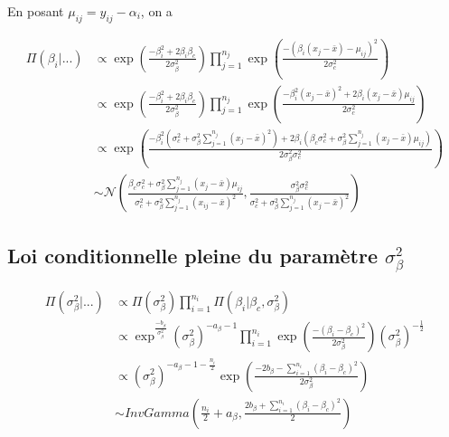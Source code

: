 \documentclass[
]{article}
\begin{document}
En posant \(\mu_{ij} = y_{ij} - \alpha_i\), on a

\begin{align*}
\Pi(\beta_{i}|...)&\propto \exp\left(\frac{-\beta_i^2+2\beta_i\beta_c}{2\sigma_{\beta}^{2}}\right) \prod_{j=1}^{n_{j}} \exp\left(\frac{-(\beta_{i}(x_{j}-\bar{x})-\mu_{ij})^{2}}{2\sigma_{c}^{2}}\right)  \\
        &\propto \exp\left(\frac{-\beta_i^2+2\beta_i\beta_c}{2\sigma_{\beta}^{2}}\right) \prod_{j=1}^{n_{j}} \exp\left(\frac{-\beta_i^2(x_{j}-\bar{x})^2+2\beta_i(x_{j}-\bar{x})\mu_{ij}}{2\sigma_{c}^{2}}\right)  \\
        &\propto \exp\left(\frac{-\beta_i^2(\sigma_c^2+\sigma_{\beta}^2\sum\limits_{j=1}^{n_j}(x_{j}-\bar{x})^2) +2\beta_i(\beta_c\sigma_c^2+\sigma_{\beta}^2\sum\limits_{j=1}^{n_j} (x_{j}-\bar{x})\mu_{ij})}{2\sigma_{\beta}^{2}\sigma_c^2}\right)\\
        &\sim \mathcal{N}\left(\frac{\beta_c\sigma_c^2+\sigma_{\beta}^2\sum\limits_{j=1}^{n_j} (x_{j}-\bar{x})\mu_{ij}}{\sigma_c^2+\sigma_{\beta}^2\sum\limits_{j=1}^{n_j}(x_{ij}-\bar{x})^2},\frac{\sigma_{\beta}^{2}\sigma_c^2}{\sigma_c^2+\sigma_{\beta}^2\sum\limits_{j=1}^{n_j}(x_{j}-\bar{x})^2}\right)
\end{align*}

\hypertarget{loi-conditionnelle-pleine-du-paramuxe8tre-sigma_beta2}{%
\subsection{\texorpdfstring{Loi conditionnelle pleine du paramètre
\(\sigma_{\beta}^2\)}{Loi conditionnelle pleine du paramètre \textbackslash sigma\_\{\textbackslash beta\}\^{}2}}\label{loi-conditionnelle-pleine-du-paramuxe8tre-sigma_beta2}}

\begin{align*}
\Pi(\sigma_{\beta}^{2}|...) &\propto \Pi(\sigma_{\beta}^{2}) \prod_{i=1}^{n_{i}}\Pi(\beta_{i}|\beta_{c},\sigma_{\beta}^{2}) \\
&\propto \exp^{\frac{-b_{\beta}}{\sigma_{\beta}^{2}}}(\sigma_{\beta}^{2})^{-a_{\beta}-1}\prod_{i=1}^{n_{i}} \exp\left(\frac{-(\beta_{i}-\beta_{c})^{2}}{2\sigma_{\beta}^{2}}\right)(\sigma_{\beta}^{2})^{-\frac{1}{2}}\\
&\propto (\sigma_{\beta}^{2})^{-a_{\beta}-1-\frac{n_{i}}{2}}\exp\left(\frac{-2b_{\beta}-\sum\limits_{i=1}^{n_{i}}(\beta_{i}-\beta_{c})^{2}}{2\sigma_{\beta}^{2}}\right)\\
&\sim InvGamma(\frac{n_{i}}{2}+a_{\beta},\frac{2b_{\beta}+\sum\limits_{i=1}^{n_{i}}(\beta_{i}-\beta_{c})^{2}}{2})
\end{align*}
\end{document}
